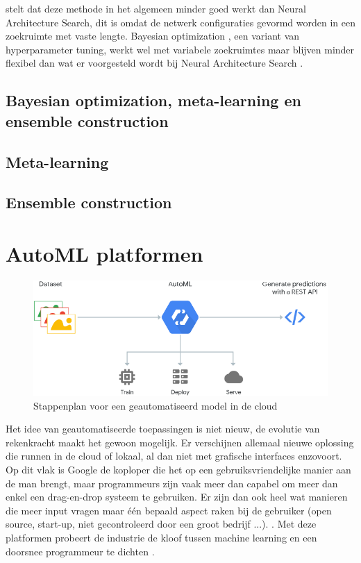 \textcite{ZophL2016} stelt dat deze methode in het algemeen minder goed werkt dan Neural Architecture Search, dit is omdat de netwerk configuraties gevormd worden in een zoekruimte met vaste lengte. Bayesian optimization \autocite{Bergstra2011}, een variant van hyperparameter tuning, werkt wel met variabele zoekruimtes maar blijven minder flexibel dan wat er voorgesteld wordt bij Neural Architecture Search \autocite{ZophL2016}.

\subsection{Bayesian optimization, meta-learning en ensemble construction}
\label{subsec:bayesian}

\subsection{Meta-learning}
\label{subsec:meta-learning}

\subsection{Ensemble construction}
\label{subsec:ensemble-construction}

\section{AutoML platformen}
\label{sec:automl-platformen}

\begin{figure}
    \includegraphics[width=\linewidth]{img/google-cloud-automl.png}
    \caption{Stappenplan voor een geautomatiseerd model in de cloud \autocite{Google2019}}
    \label{fig:google-cloud-automl}
\end{figure}

Het idee van geautomatiseerde toepassingen is niet nieuw, de evolutie van rekenkracht maakt het gewoon mogelijk. Er verschijnen allemaal nieuwe oplossing die runnen in de cloud of lokaal, al dan niet met grafische interfaces enzovoort. Op dit vlak is Google de koploper die het op een gebruiksvriendelijke manier aan de man brengt, maar programmeurs zijn vaak meer dan capabel om meer dan enkel een drag-en-drop systeem te gebruiken. Er zijn dan ook heel wat manieren die meer input vragen maar één bepaald aspect raken bij de gebruiker (open source, start-up, niet gecontroleerd door een groot bedrijf ...). . Met deze platformen probeert de industrie de kloof tussen machine learning en een doorsnee programmeur te dichten \autocite{Gutierrez2019}.

